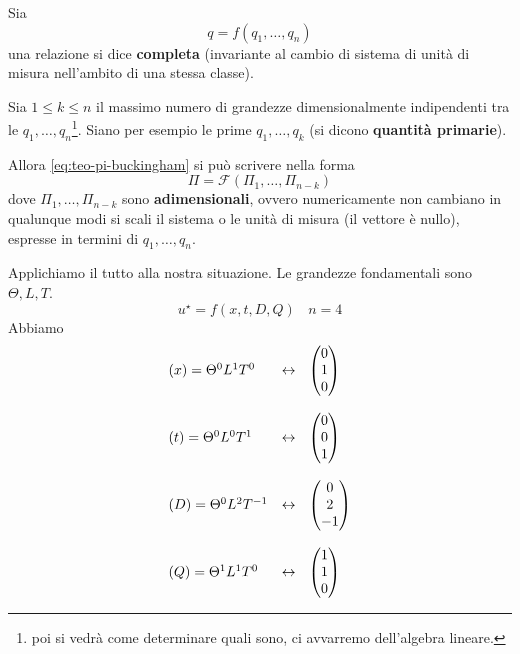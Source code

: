 \documentclass[10pt,a4paper,twoside,openright]{book}
\begin{document}
\begin{theorem}
[Pi di Buckingham] Sia
\begin{equation}
q=f( q_{1},\dotsc,q_{n}) \tag{R}
\label{eq:teo-pi-buckingham}
\end{equation}
una relazione si dice \textbf{completa} (invariante al cambio di sistema di unità di misura nell'ambito di una stessa classe).

Sia $1\leqslant k\leqslant n$ il massimo numero di grandezze dimensionalmente indipendenti tra le $q_{1},\dotsc,q_{n}$\footnote{poi si vedrà come determinare quali sono, ci avvarremo dell'algebra lineare.}. Siano per esempio le prime $q_{1},\dotsc,q_{k}$ (si dicono \textbf{quantità primarie}).

Allora \eqref{eq:teo-pi-buckingham} si può scrivere nella forma
\begin{equation*}
\Pi =\mathcal{F}( \Pi _{1},\dotsc,\Pi _{n-k})
\end{equation*}
dove $\Pi _{1},\dotsc,\Pi _{n-k}$ sono \textbf{adimensionali}, ovvero numericamente non cambiano in qualunque modi si scali il sistema o le unità di misura (il vettore è nullo), espresse in termini di $q_{1},\dotsc,q_{n}$.
\end{theorem}
Applichiamo il tutto alla nostra situazione. Le grandezze fondamentali sono $\Theta,L,T$.
\begin{equation*}
u^{\star } =f(x,t,D,Q) \ \ \ \ n=4
\end{equation*}
Abbiamo
\begin{equation*}
\begin{array}{ l l }
(x) =\Theta ^{0} L^{1} T^{0} & \leftrightarrow \ \ \begin{pmatrix}
0\\
1\\
0
\end{pmatrix}\\\\
(t) =\Theta ^{0} L^{0} T^{1} & \leftrightarrow \ \ \begin{pmatrix}
0\\
0\\
1
\end{pmatrix}\\\\
(D) =\Theta ^{0} L^{2} T^{-1} & \leftrightarrow \ \ \begin{pmatrix}
0\\
2\\
-1
\end{pmatrix}\\\\
(Q) =\Theta ^{1} L^{1} T^{0} & \leftrightarrow \ \ \begin{pmatrix}
1\\
1\\
0
\end{pmatrix}
\end{array}
\end{equation*}
\end{document}
